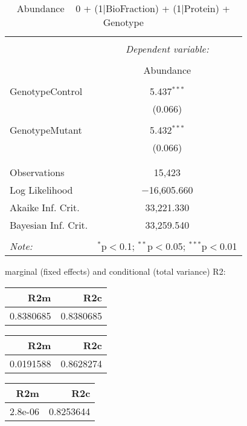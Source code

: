 \documentclass[11pt]{report}
\begin{document}
\begin{table}[!htbp] \centering 
  \caption{Abundance ~ 0 + (1|BioFraction) + (1|Protein) + Genotype} 
  \label{} 
\begin{tabular}{@{\extracolsep{5pt}}lc} 
\\[-1.8ex]\hline 
\hline \\[-1.8ex] 
 & \multicolumn{1}{c}{\textit{Dependent variable:}} \\ 
\cline{2-2} 
\\[-1.8ex] & Abundance \\ 
\hline \\[-1.8ex] 
 GenotypeControl & 5.437$^{***}$ \\ 
  & (0.066) \\ 
  & \\ 
 GenotypeMutant & 5.432$^{***}$ \\ 
  & (0.066) \\ 
  & \\ 
\hline \\[-1.8ex] 
Observations & 15,423 \\ 
Log Likelihood & $-$16,605.660 \\ 
Akaike Inf. Crit. & 33,221.330 \\ 
Bayesian Inf. Crit. & 33,259.540 \\ 
\hline 
\hline \\[-1.8ex] 
\textit{Note:}  & \multicolumn{1}{r}{$^{*}$p$<$0.1; $^{**}$p$<$0.05; $^{***}$p$<$0.01} \\ 
\end{tabular} 
\end{table} 
marginal (fixed effects) and conditional (total variance) R2:

\begin{tabular}{r|r}
\hline
R2m & R2c\\
\hline
0.8380685 & 0.8380685\\
\hline
\end{tabular}

\begin{tabular}{r|r}
\hline
R2m & R2c\\
\hline
0.0191588 & 0.8628274\\
\hline
\end{tabular}

\begin{tabular}{r|r}
\hline
R2m & R2c\\
\hline
2.8e-06 & 0.8253644\\
\hline
\end{tabular}
\end{document}
